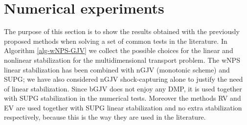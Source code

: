 

\section{Numerical experiments}\label{s-numex}
%
The purpose of this section is to show the results obtained with the previously proposed methods when solving a set of common tests in the literature. In Algorithm \ref{alg-wNPS-GJV}  we collect the possible choices for the linear and nonlinear stabilization for the multidimensional transport problem. The wNPS linear stabilization has been combined with nGJV (monotonic scheme) and SUPG; we have also considered nGJV shock-capturing alone to justify the need of linear stabilization. Since bGJV does not enjoy any DMP, it is used together with SUPG stabilization in the numerical tests. Moreover the methods RV and EV are used together with SUPG linear stabilization and no extra stabilization respectively, because this is the way they are used in the literature. 


